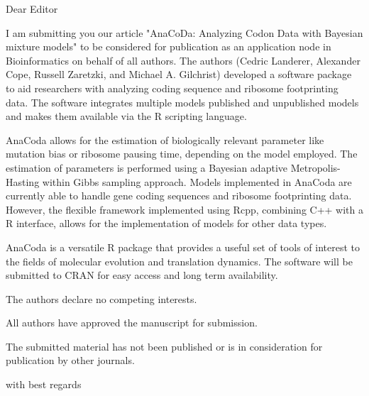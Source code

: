 \documentclass[11pt,letterpaper]{letter}
\begin{document}
 
\begin{letter}{} 
\opening{Dear Editor} 

I am submitting you our article "AnaCoDa: Analyzing Codon Data with Bayesian mixture models" to be considered for publication as an application node in Bioinformatics on behalf of all authors.
The authors (Cedric Landerer, Alexander Cope, Russell Zaretzki, and Michael A. Gilchrist) developed a software package to aid researchers with analyzing coding sequence and ribosome footprinting data. 
The software integrates multiple models published and unpublished models and makes them available via the R scripting language. 

AnaCoda allows for the estimation of biologically relevant parameter like mutation bias or ribosome pausing time, depending on the model employed.
The estimation of parameters is performed using a Bayesian adaptive Metropolis-Hasting within Gibbs sampling approach.
Models implemented in AnaCoda are currently able to handle gene coding sequences and ribosome footprinting data. 
However, the flexible framework implemented using Rcpp, combining C++ with a R interface, allows for the implementation of models for other data types.

AnaCoda is a versatile R package that provides a useful set of tools of interest to the fields of molecular evolution and translation dynamics.
The software will be submitted to CRAN for easy access and long term availability.


The authors declare no competing interests.

All authors have approved the manuscript for submission.

The submitted material has not been published or is in consideration for publication by other journals. 
 
\closing{with best regards} 
\end{letter} 
\end{document}
